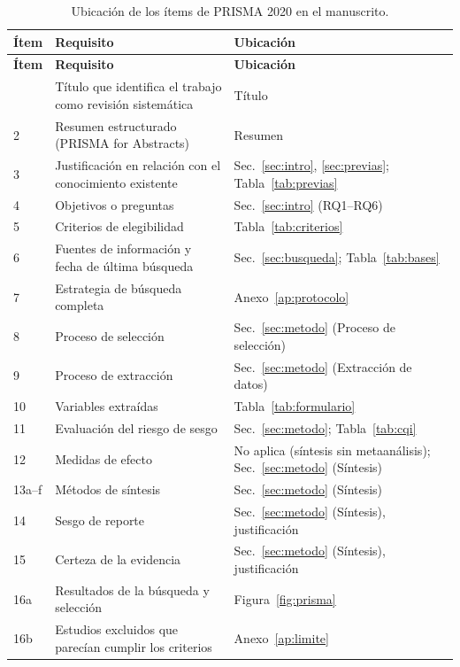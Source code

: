 \documentclass[12pt, a4paper]{article}
\begin{document}
\begin{small}
\begin{longtable}{lP{8.8cm}P{4.0cm}}
\caption{Ubicaci\'{o}n de los \'{i}tems de PRISMA 2020 en el manuscrito.\label{tab:prisma_check}}\\
\toprule
\textbf{\'{I}tem} & \textbf{Requisito} & \textbf{Ubicaci\'{o}n} \\
\midrule\endfirsthead
\toprule
\textbf{\'{I}tem} & \textbf{Requisito} & \textbf{Ubicaci\'{o}n} \\
\midrule\endhead
\bottomrule{} & T\'{i}tulo que identifica el trabajo como revisi\'{o}n sistem\'{a}tica & T\'{i}tulo \\
2 & Resumen estructurado (PRISMA for Abstracts) & Resumen \\
3 & Justificaci\'{o}n en relaci\'{o}n con el conocimiento existente & Sec.~\ref{sec:intro}, \ref{sec:previas}; Tabla~\ref{tab:previas} \\
4 & Objetivos o preguntas & Sec.~\ref{sec:intro} (RQ1--RQ6) \\
5 & Criterios de elegibilidad & Tabla~\ref{tab:criterios} \\
6 & Fuentes de informaci\'{o}n y fecha de \'{u}ltima b\'{u}squeda & Sec.~\ref{sec:busqueda}; Tabla~\ref{tab:bases} \\
7 & Estrategia de b\'{u}squeda completa & Anexo~\ref{ap:protocolo} \\
8 & Proceso de selecci\'{o}n & Sec.~\ref{sec:metodo} (Proceso de selecci\'{o}n) \\
9 & Proceso de extracci\'{o}n & Sec.~\ref{sec:metodo} (Extracci\'{o}n de datos) \\
10 & Variables extra\'{i}das & Tabla~\ref{tab:formulario} \\
11 & Evaluaci\'{o}n del riesgo de sesgo & Sec.~\ref{sec:metodo}; Tabla~\ref{tab:cqi} \\
12 & Medidas de efecto & No aplica (s\'{i}ntesis sin metaan\'{a}lisis); Sec.~\ref{sec:metodo} (S\'{i}ntesis) \\
13a--f & M\'{e}todos de s\'{i}ntesis & Sec.~\ref{sec:metodo} (S\'{i}ntesis) \\
14 & Sesgo de reporte & Sec.~\ref{sec:metodo} (S\'{i}ntesis), justificaci\'{o}n \\
15 & Certeza de la evidencia & Sec.~\ref{sec:metodo} (S\'{i}ntesis), justificaci\'{o}n \\
16a & Resultados de la b\'{u}squeda y selecci\'{o}n & Figura~\ref{fig:prisma} \\
16b & Estudios excluidos que parec\'{i}an cumplir los criterios & Anexo~\ref{ap:limite} \\

\end{longtable}
\end{small}
\end{document}
